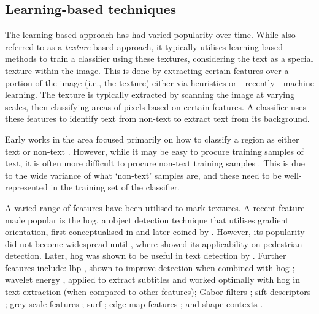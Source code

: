 \clearpage

\subsection{Learning-based techniques}
\label{sec:background:detection:learning}

The learning-based approach has had varied popularity over time. While also referred to as a \textit{texture}-based approach, it typically utilises learning-based methods to train a classifier using these textures, considering the text as a special texture within the image. This is done by extracting certain features over a portion of the image (i.e., the texture) either via heuristics or---recently---machine learning. The texture is typically extracted by scanning the image at varying scales, then classifying areas of pixels based on certain features. A classifier uses these features to identify text from non-text to extract text from its background.

Early works in the area focused primarily on how to classify a region as either text or non-text \citep{Sobottka:1999wi, Lienhart:2002ub, Li:2000uf, Kim:2003wj}. However, while it may be easy to procure training samples of text, it is often more difficult to procure non-text training samples \cite{Sung:1998vt,Heisele:2001ue}. This is due to the wide variance of what `non-text' samples are, and these need to be well-represented in the training set of the classifier.

A varied range of features have been utilised to mark textures. A recent feature made popular is the \gls{hog}, a object detection technique that utilises gradient orientation, first conceptualised in \citep{McConnell:1986wsb} and later coined by \citet{Freeman:1995uh}. However, its popularity did not become widespread until \citep{Dalal:2005jq}, where \citeauthor{Dalal:2005jq} showed its applicability on pedestrian detection. Later, \gls{hog} was shown to be useful in text detection by \citet{Hanif:2008un}. Further features include: \gls{lbp} \citep{Ojala:1994hz}, shown to improve detection when combined with \gls{hog} \cite{Wang:2009wi}; wavelet energy \citep{Mohan:2001vb, Viola:2003ud}, applied to extract subtitles \citep{Gllavata:2004vq} and worked optimally with \gls{hog} in text extraction \citep{Pan:2010cj} (when compared to other features); Gabor filters \citep{Liu:2005et}; \gls{sift} descriptors \citep{Lowe:2004kp}; grey scale features \citep{Kim:2003wj}; \gls{surf} \cite{Bay:2008ud}; edge map features \cite{Chen:2004tj}; and shape contexts \citep{Belongie:2001uj}.

